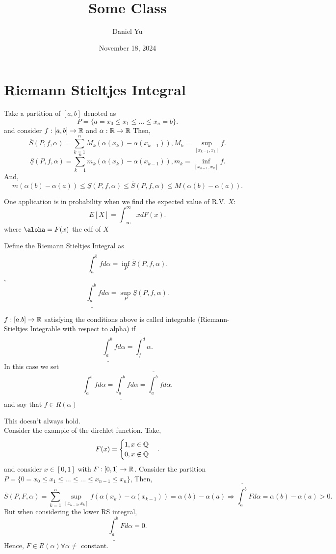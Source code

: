 \documentclass[a4paper]{article}
\title{\Huge{Some Class}}
\author{\huge{Daniel Yu}}
\date{November 18, 2024}
\newcommand{\upRint}[2]{
  \overline{\int_{#1}^{#2}}
}
\newcommand{\loRint}[2]{
  \underline{\int_{#1}^{#2}}
}
\begin{document}
\maketitle
\newpage%
\tableofcontents
\pagebreak
  \section{Riemann Stieltjes Integral}
  Take a partition of $[a,b]$ denoted as 
   \[
  P =\{a = x_0 \leq x_1 \leq \ldots \leq x_n = b\} 
.\] and consider $f: [a,b] \to \mathbb{R}$ and $\alpha: \mathbb{R} \to \mathbb{R}$ 
  Then,
  \[
    \overline{S}(P, f, \alpha) = \sum_{k=1}^{n} M_k (\alpha(x_k) - \alpha (x_{k-1})), M_{k} = \sup_{[x_{k-1}, x_k]} f 
  .\] 
  \[
    \underline{S} (P, f, \alpha) = \sum_{k=1}^{n} m_k (\alpha (x_k) - \alpha (x_{k-1})), m_{k} = \inf_{[x_{k-1}, x_{k}]} f
  .\]
  And,
  \[
    m(\alpha(b) - \alpha(a)) \leq \underline{S} (P, f, \alpha) \leq \overline{S} (P, f, \alpha) \leq M(\alpha(b) - \alpha(a))  
  .\] 

  One application is in probability when we find the expected value of R.V. $X$:
   \[
     E[X] = \int_{-\infty}^{\infty}   x dF(x)
  .\] 
  where $\aloha = F(x)$ the cdf of $X$

  \noindent\hrulefill

\begin{definition}
  Define the Riemann Stieltjes Integral as 
  \[
  \upRint{a}{b} f d\alpha = \inf_{P} \overline{S} (P, f, \alpha) 
  .\],
  \[
    \loRint{a}{b} f d \alpha = \sup_{P} \underline{S} (P, f, \alpha)  
  .\]
\end{definition}

\begin{definition}
  $f:[a.b] \to \mathbb{R}$ satisfying the conditions above is called integrable (Riemann-Stieltjes Integrable with respect to alpha) if 
  \[
    \loRint{a}{b} f d \alpha = \upRint f d \alpha
  .\] 
  In this case we set
  \[
    \int_{a}^{b} f d \alpha = \loRint{a}{b} f d \alpha = \upRint{a}{b} f d \alpha 
  .\]
  and say that $f \in R(\alpha)$
\end{definition}

\begin{note}
  This doesn't always hold. \\

  Consider the example of the dirchlet function. Take,
  \[
  F(x) = \begin{cases}
    1, x \in \mathbb{Q} \\
    0, x \not\in \mathbb{Q}
  \end{cases}
  .\] 
  and consider $x \in [0,1]$ with  $F: [0,1] \to \mathbb{R}$. Consider the partition $P=\{0 = x_0 \leq x_1 \leq \ldots \leq \ldots \leq x_{n-1} \leq x_n\} $, Then,
   \[
     \overline{S}(P, F, \alpha) = \sum_{k=1}^{n} \sup_{[x_{k-1}, x_k] } f (\alpha (x_k) - \alpha (x_{k-1})) = \alpha(b) - \alpha(a) \Rightarrow \upRint{a}{b} F d\alpha = \alpha(b) - \alpha (a) > 0 
   .\] 
   But when considering the lower RS integral,
   \[
     \loRint{a}{b} F d\alpha = 0
   .\] 
   Hence, $F \in R(\alpha) \forall \alpha \neq$ constant.
\end{note}
\end{document}
